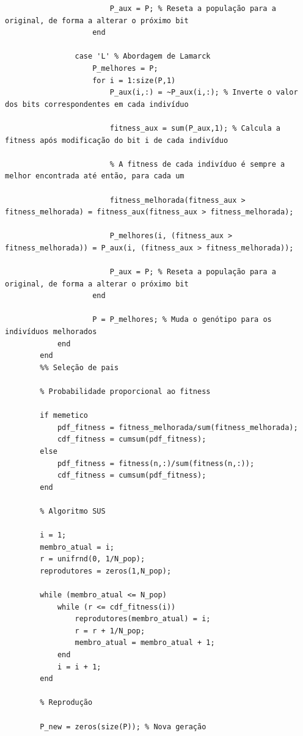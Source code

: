 \documentclass{report}
\begin{document}
\begin{lstlisting}
                        P_aux = P; % Reseta a população para a original, de forma a alterar o próximo bit
                    end
                    
                case 'L' % Abordagem de Lamarck
                    P_melhores = P;
                    for i = 1:size(P,1)
                        P_aux(i,:) = ~P_aux(i,:); % Inverte o valor dos bits correspondentes em cada indivíduo
                        
                        fitness_aux = sum(P_aux,1); % Calcula a fitness após modificação do bit i de cada indivíduo
                        
                        % A fitness de cada indivíduo é sempre a melhor encontrada até então, para cada um
                        
                        fitness_melhorada(fitness_aux > fitness_melhorada) = fitness_aux(fitness_aux > fitness_melhorada);
                        
                        P_melhores(i, (fitness_aux > fitness_melhorada)) = P_aux(i, (fitness_aux > fitness_melhorada));
                        
                        P_aux = P; % Reseta a população para a original, de forma a alterar o próximo bit
                    end
                    
                    P = P_melhores; % Muda o genótipo para os indivíduos melhorados
            end
        end
        %% Seleção de pais

        % Probabilidade proporcional ao fitness
        
        if memetico
            pdf_fitness = fitness_melhorada/sum(fitness_melhorada);
            cdf_fitness = cumsum(pdf_fitness);
        else
            pdf_fitness = fitness(n,:)/sum(fitness(n,:));
            cdf_fitness = cumsum(pdf_fitness);
        end
        
        % Algoritmo SUS

        i = 1;
        membro_atual = i;
        r = unifrnd(0, 1/N_pop);    
        reprodutores = zeros(1,N_pop);

        while (membro_atual <= N_pop)
            while (r <= cdf_fitness(i))
                reprodutores(membro_atual) = i;
                r = r + 1/N_pop;
                membro_atual = membro_atual + 1; 
            end
            i = i + 1;
        end

        % Reprodução

        P_new = zeros(size(P)); % Nova geração


\end{lstlisting}
\end{document}
